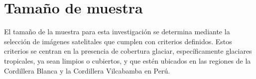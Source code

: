 \section{Tamaño de muestra}
\label{sec:TamanoMuestra}

El tamaño de la muestra para esta investigación se determina mediante la selección de imágenes satelitales que cumplen con criterios definidos. Estos criterios se centran en la presencia de cobertura glaciar, específicamente glaciares tropicales, ya sean limpios o cubiertos, y que estén ubicados en las regiones de la Cordillera Blanca y la Cordillera Vilcabamba en Perú.